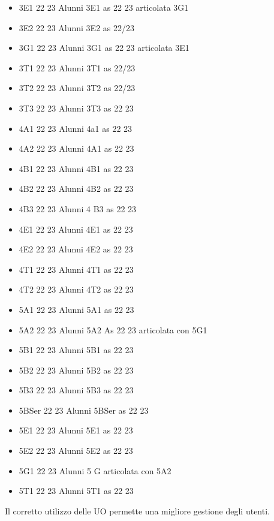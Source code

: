 \begin{itemize}
\begin{itemize}
\begin{itemize}
	\item 3E1 22 23
	Alunni 3E1 as 22 23 articolata 3G1	
	\item 3E2 22 23
	Alunni 3E2 as 22/23	
	\item 3G1 22 23
	Alunni 3G1 as 22 23 articolata 3E1	
	\item 3T1 22 23
	Alunni 3T1 as 22/23	
	\item 3T2 22 23
	Alunni 3T2 as 22/23	
	\item 3T3 22 23
	Alunni 3T3 as 22 23	
	\item 4A1 22 23
	Alunni 4a1 as 22 23	
	\item 4A2 22 23
	Alunni 4A1 as 22 23	
	\item 4B1 22 23
	Alunni 4B1 as 22 23	
	\item 4B2 22 23
	Alunni 4B2 as 22 23	
	\item 4B3 22 23
	Alunni 4 B3 as 22 23	
	\item 4E1 22 23
	Alunni 4E1 as 22 23	
	\item 4E2 22 23
	Alunni 4E2 as 22 23	
	\item 4T1 22 23
	Alunni 4T1 as 22 23	
	\item 4T2 22 23
	Alunni 4T2 as 22 23	
	\item 5A1 22 23
	Alunni 5A1 as 22 23	
	\item 5A2 22 23
	Alunni 5A2 As 22 23 articolata con 5G1	
	\item 5B1 22 23
	Alunni 5B1 as 22 23	
	\item 5B2 22 23
	Alunni 5B2 as 22 23	
	\item 5B3 22 23
	Alunni 5B3 as 22 23	
	\item 5BSer 22 23
	Alunni 5BSer as 22 23	
	\item 5E1 22 23
	Alunni 5E1 as 22 23	
	\item 5E2 22 23
	Alunni 5E2 as 22 23	
	\item 5G1 22 23
	Alunni 5 G articolata con 5A2	
	\item 5T1 22 23
	Alunni 5T1 as 22 23	
	\end{itemize}
	\end{itemize}
\end{itemize} 

Il corretto utilizzo delle UO permette  una  migliore gestione degli utenti.